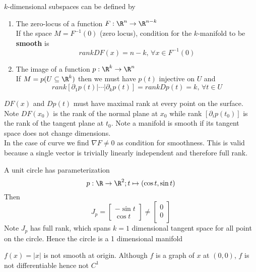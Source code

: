 \documentclass[11pt]{article}
\begin{document}
\begin{defn*}
  $k$-dimensional subspaces can be defined by
  \begin{enumerate}
    \item The zero-locus of a function $F: \R^n \to \R^{n-k}$\\
    If the space $M = F^{-1}(0)$ (zero locus), condition for the $k$-manifold to be \textbf{smooth} is
    \[
      rank DF(x) = n-k \text{,      } \forall x\in F^{-1}(0)
    \]

    \item The image of a function $p: \R^k \to \R^n$\\
    If $M = p(U\subseteq \R^k)$ then we must have $p(t)$ injective on $U$ and
    \[
      rank[\partial_1 p(t) |  \cdots | \partial_k p(t)] = rank Dp(t) = k \text{,    } \forall t\in U
    \]
  \end{enumerate}

  \begin{rem}
    $DF(x)$ and $Dp(t)$ must have maximal rank at every point on the surface. Note $DF(x_0)$ is the rank of the normal plane at $x_0$ while rank $[\partial_i p(t_0)]$ is the rank of the tangent plane at $t_0$. Note a manifold is smooth if its tangent space does not change dimensions.\\
    In the case of curve we find $\nabla F \neq 0$ as condition for smoothness. This is valid because a single vector is trivially linearly independent and therefore full rank.
  \end{rem}
\end{defn*}

\begin{example}
  A unit circle has parameterization
  \[
    p: \R\to\R^2 ; t \mapsto (\cos t, \sin t)
  \]
  Then
  \[
    J_p =
    \begin{bmatrix}
      -\sin t \\
      \cos t
    \end{bmatrix}
    \neq
    \begin{bmatrix}
      0\\
      0\\
    \end{bmatrix}
  \]
  Note $J_p$ has full rank, which spans $k=1$ dimensional tangent space for all point on the circle. Hence the circle is a 1 dimensional manifold
\end{example}

\begin{example}
  $f(x) = |x|$ is not smooth at origin. Although $f$ is a graph of $x$ at $(0,0)$, $f$ is not differentiable hence not $C^1$
\end{example}
\end{document}

